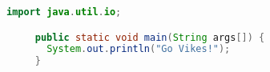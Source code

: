 \documentclass[12pt,a4paper]{article}
\begin{document}
   \begin{lstlisting}[caption="Go Vikes!", language=java]
     import java.util.io;

     public static void main(String args[]) {
       System.out.println("Go Vikes!");
     }
  \end{lstlisting}
\end{document}
